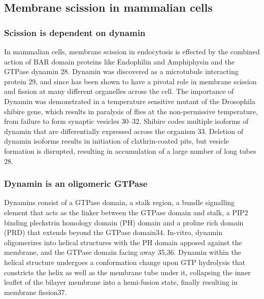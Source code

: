 		
\subsection{Membrane scission in mammalian cells}
		\subsubsection{Scission is dependent on dynamin} 
		In mammalian cells, membrane scission in endocytosis is effected by the combined action of BAR domain proteins like Endophilin and Amphiphysin and the GTPase dynamin 28.  Dynamin was discovered as a microtubule interacting protein 29, and since has been shown to have a pivotal role in membrane scission and fission at many different organelles across the cell. The importance of Dynamin was demonstrated in a temperature sensitive mutant of the Drosophila shibire gene, which results in paralysis of flies at the non-permissive temperature, from failure to form synaptic vesicles 30–32. Shibire codes multiple isoforms of dynamin that are differentially expressed across the organism 33. Deletion of dynamin isoforms results in initiation of clathrin-coated pits, but vesicle formation is disrupted, resulting in accumulation of a large number of long tubes 28. 

		 
		\subsubsection{Dynamin is an oligomeric GTPase}
		Dynamins consist of a GTPase domain, a stalk region, a bundle signalling element that acts as the linker between the GTPase domain and stalk, a PIP2 binding pleckstrin homology domain (PH) domain and a proline rich domain (PRD) that extends beyond the GTPase domain34. In-vitro, dynamin oligomerizes into helical structures with the PH domain apposed against the membrane, and the GTPase domain facing away 35,36. Dynamin within the helical structure undergoes a conformation change upon GTP hydrolysis that constricts the helix as well as the membrane tube under it, collapsing the inner leaflet of the bilayer membrane into a hemi-fusion state, finally resulting in membrane fission37.

